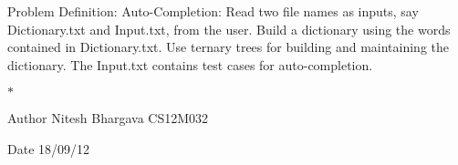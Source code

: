 \begin{DoxyParagraph}{\-Problem \-Definition\-:}
\-Auto-\/\-Completion\-: \-Read two file names as inputs, say \-Dictionary.\-txt and \-Input.\-txt, from the user. \-Build a dictionary using the words contained in \-Dictionary.\-txt. \-Use ternary trees for building and maintaining the dictionary. \-The \-Input.\-txt contains test cases for auto-\/completion.
\end{DoxyParagraph}
$\ast$ \begin{DoxyAuthor}{\-Author}
\-Nitesh \-Bhargava \-C\-S12\-M032 
\end{DoxyAuthor}
\begin{DoxyDate}{\-Date}
18/09/12 
\end{DoxyDate}
